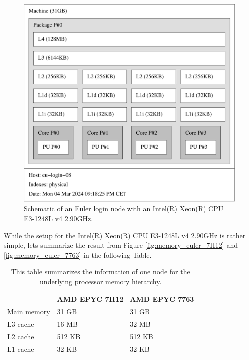 \documentclass[unicode,11pt,a4paper,oneside,numbers=endperiod,openany]{scrartcl}
\begin{document}
\begin{figure}[H]
    \centering
    \includegraphics[width=\textwidth]{Images/XEON_E3-1284L.pdf}
    \caption{Schematic of an Euler login node with an Intel(R) Xeon(R) CPU E3-1248L v4 \@ 2.90GHz.}
    \label{fig:memory_euler}
  \end{figure}

While the setup for the Intel(R) Xeon(R) CPU E3-1248L v4 \@ 2.90GHz is rather simple, lets summarize the result
from Figure \ref{fig:memory_euler_7H12} and \ref{fig:memory_euler_7763} in the following Table.

\begin{table}[h]
    \centering
    \begin{tabular}{l|l|l|}
        & \textbf{AMD EPYC 7H12} & \textbf{AMD EPYC 7763} \\
      \hline
      Main memory & 31 GB & 31 GB \\
      \hline
      L3 cache & 16 MB & 32 MB \\
      \hline
      L2 cache & 512 KB & 512 KB \\
      \hline
      L1 cache & 32 KB & 32 KB \\
      \hline
    \end{tabular}
    \caption{This table summarizes the information of one node for the underlying processor memory hierarchy.}
    \label{tab:summary_memory}
\end{table}
\end{document}
